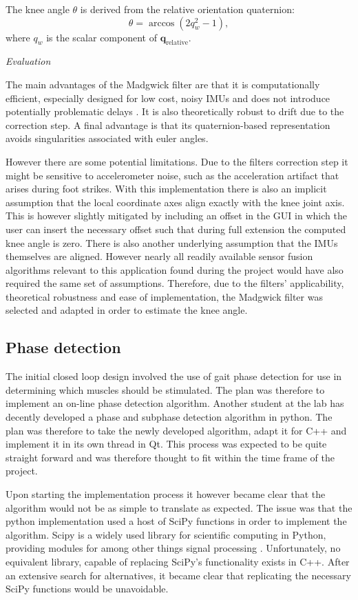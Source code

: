 The knee angle \( \theta \) is derived from the relative orientation quaternion:
\[
\theta = \arccos{\left( 2q_w^2 - 1 \right)},
\]
where \( q_w \) is the scalar component of \( \mathbf{q}_{\text{relative}} \).
\newline

\textit{Evaluation}

The main advantages of the Madgwick filter are that it is computationally efficient, especially designed for low cost, noisy IMUs and does not introduce potentially problematic delays . It is also theoretically robust to drift due to the correction step. A final advantage is that its quaternion-based representation avoids singularities associated with euler angles. 

However there are some potential limitations. Due to the filters correction step it might be sensitive to accelerometer noise, such as the acceleration artifact that arises during foot strikes. With this implementation there is also an implicit assumption that the local coordinate axes align exactly with the knee joint axis. This is however slightly mitigated by including an offset in the GUI in which the user can insert the necessary offset such that during full extension the computed knee angle is zero. There is also another underlying assumption that the IMUs themselves are aligned. However nearly all readily available sensor fusion algorithms relevant to this application found during the project would have also required the same set of assumptions. Therefore, due to the filters' applicability, theoretical robustness and ease of implementation, the Madgwick filter was selected and adapted in order to estimate the knee angle.


\subsection{Phase detection}

The initial closed loop design involved the use of gait phase detection for use in determining which muscles should be stimulated. The plan was therefore to implement an on-line phase detection algorithm. Another student at the lab has decently developed a phase and subphase detection algorithm in python. The plan was therefore to take the newly developed algorithm, adapt it for C++ and implement it in its own thread in Qt. This process was expected to be quite straight forward and was therefore thought to fit within the time frame of the project.

Upon starting the implementation process it however became clear that the algorithm would not be as simple to translate as expected. The issue was that the python implementation used a host of SciPy \cite{noauthor_scipy_nodate} functions in order to implement the algorithm. Scipy is a  widely used library for scientific computing in Python, providing modules for among other things signal processing \cite{noauthor_scipy_nodate}. Unfortunately, no equivalent library, capable of replacing SciPy's functionality exists in C++. After an extensive search for alternatives, it became clear that replicating the necessary SciPy functions would be unavoidable.

